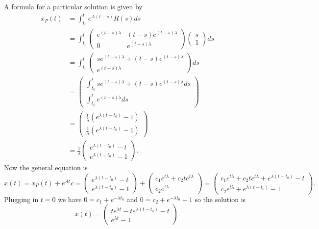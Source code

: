 \documentclass{article}
\begin{document}
A formula for a particular solution is given by
\begin{align*}
x_P(t)
&= \int_{t_0}^t e^{A(t-s)} R(s) ds\\
&= \int_{t_0}^t
\left (
\begin{array}{cc}
e^{(t-s) \lambda} & (t-s)e^{(t-s) \lambda}\\
0 & e^{(t-s) \lambda}
\end{array}
\right ) \left (
\begin{array}{c}
s\\
1
\end{array}
\right ) ds\\
&= \int_{t_0}^t
\left (
\begin{array}{c}
se^{(t-s) \lambda} + (t-s)e^{(t-s) \lambda}\\
e^{(t-s) \lambda}
\end{array}
\right ) ds\\
&= \left (
\begin{array}{c}
\int_{t_0}^t se^{(t-s) \lambda} + (t-s)e^{(t-s) \lambda} ds\\
\int_{t_0}^t e^{(t-s) \lambda} ds
\end{array}
\right )\\
&= \left (
\begin{array}{c}
\frac{t}{\lambda} (e^{\lambda(t-t_0)} - 1)\\
\frac{1}{\lambda} (e^{\lambda (t-t_0)} - 1)
\end{array}
\right )\\
&= \frac{1}{\lambda} \left (
\begin{array}{c}
e^{\lambda (t - t_0)} - t\\
e^{\lambda (t - t_0)} - 1
\end{array}
\right ).
\end{align*}
Now the general equation is
\[
x(t) = x_P(t) + e^{A t}c =
\left (
\begin{array}{c}
e^{\lambda (t - t_0)} - t\\
e^{\lambda (t - t_0)} - 1
\end{array}
\right ) + \left (
\begin{array}{c}
c_1 e^{t \lambda} + c_2 t e^{t \lambda}\\
c_2 e^{t \lambda}
\end{array}
\right ) = \left (
\begin{array}{c}
c_1 e^{t \lambda} + c_2 t e^{t \lambda} + e^{\lambda (t - t_0)} - t\\
c_2 e^{t \lambda} + e^{\lambda (t - t_0)} - 1
\end{array}
\right ).
\]
Plugging in $t = 0$ we have $0 = c_1 + e^{-\lambda t_0}$ and $0 = c_2 + e^{-\lambda t_0} - 1$ so the solution is
\[
x(t) = \left (
\begin{array}{c}
te^{\lambda t} - te^{\lambda (t - t_0)} - t\\
e^{\lambda t} - 1
\end{array}
\right ).
\]
\end{document}

